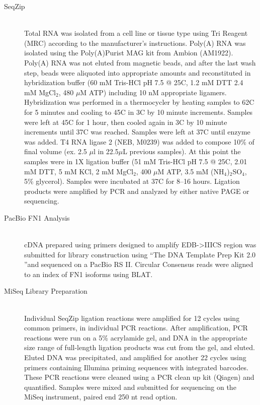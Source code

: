 {\begin{description}
		\item[SeqZip] \hfill \\
		Total RNA was isolated from a cell line or tissue type using Tri Reagent (MRC) according to the manufacturer’s instructions. Poly(A) RNA was isolated using the Poly(A)Purist MAG kit from Ambion (AM1922). Poly(A) RNA was not eluted from magnetic beads, and after the last wash step, beads were aliquoted into appropriate amounts and reconstituted in hybridization buffer (60 mM Tris-HCl pH 7.5 @ 25\degree C, 1.2 mM DTT 2.4 mM MgCl$_{2}$, 480 $\mu$M ATP) including 10 nM appropriate ligamers. Hybridization was performed in a thermocycler by heating samples to 62\degree C for 5 minutes and cooling to 45\degree C in 3\degree C by 10 minute increments. Samples were left at 45\degree C for 1 hour, then cooled again in 3\degree C by 10 minute increments until 37C was reached. Samples were left at 37\degree C until enzyme was added. T4 RNA ligase 2 (NEB, M0239) was added to compose 10\% of final volume (ex. 2.5 $\mu$l in 22.5$\mu$L previous samples). At this point the samples were in 1X ligation buffer (51 mM Tris-HCl pH 7.5 @ 25\degree C, 2.01 mM DTT, 5 mM KCl, 2 mM MgCl$_{2}$, 400 $\mu$M ATP, 3.5 mM (NH$_{4}$)$_{2}$SO$_{4}$, 5\% glycerol). Samples were incubated at 37\degree C for 8–16 hours. Ligation products were amplified by PCR and analyzed by either native PAGE or sequencing.

		\item[PacBio FN1 Analysis] \hfill \\
		cDNA prepared using primers designed to amplify EDB->IIICS region was submitted for library construction using ``The DNA Template Prep Kit 2.0 ''and sequenced on a PacBio RS II. Circular Consensus reads were aligned to an index of FN1 isoforms using BLAT. 

		\item[MiSeq Library Preparation] \hfill \\
		Individual SeqZip ligation reactions were amplified for 12 cycles using common primers, in individual PCR reactions. After amplification, PCR reactions were run on a 5\% acrylamide gel, and DNA in the appropriate size range of full-length ligation products was cut from the gel, and eluted. Eluted DNA was precipitated, and amplified for another 22 cycles using primers containing Illumina priming sequences with integrated barcodes. These PCR reactions were cleaned using a PCR clean up kit (Qiagen) and quantified. Samples were mixed and submitted for sequencing on the MiSeq instrument, paired end 250 nt read option.


\end{description}}

